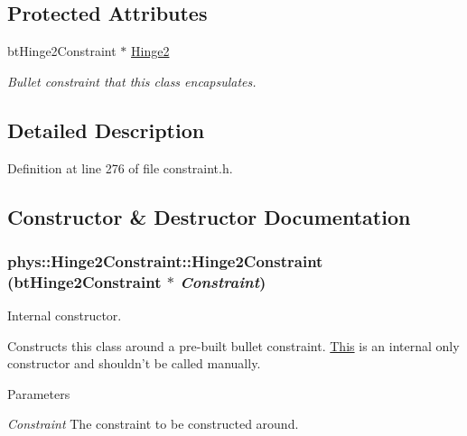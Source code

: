 \subsection*{Protected Attributes}
\begin{DoxyCompactItemize}
\item 
\hypertarget{classphys_1_1Hinge2Constraint_aa32c384f4c51895001e4378342d8f45e}{
btHinge2Constraint $\ast$ \hyperlink{classphys_1_1Hinge2Constraint_aa32c384f4c51895001e4378342d8f45e}{Hinge2}}
\label{d2/d16/classphys_1_1Hinge2Constraint_aa32c384f4c51895001e4378342d8f45e}

\begin{DoxyCompactList}\small\item\em Bullet constraint that this class encapsulates. \item\end{DoxyCompactList}\end{DoxyCompactItemize}


\subsection{Detailed Description}


Definition at line 276 of file constraint.h.



\subsection{Constructor \& Destructor Documentation}
\hypertarget{classphys_1_1Hinge2Constraint_aaf937ddb299b8b47e243e83dfd585e44}{
\subsubsection[{Hinge2Constraint}]{\setlength{\rightskip}{0pt plus 5cm}phys::Hinge2Constraint::Hinge2Constraint (btHinge2Constraint $\ast$ {\em Constraint})}}
\label{d2/d16/classphys_1_1Hinge2Constraint_aaf937ddb299b8b47e243e83dfd585e44}


Internal constructor. 

Constructs this class around a pre-\/built bullet constraint. \hyperlink{structThis}{This} is an internal only constructor and shouldn't be called manually. 
\begin{DoxyParams}{Parameters}
\item[{\em Constraint}]The constraint to be constructed around. \end{DoxyParams}


